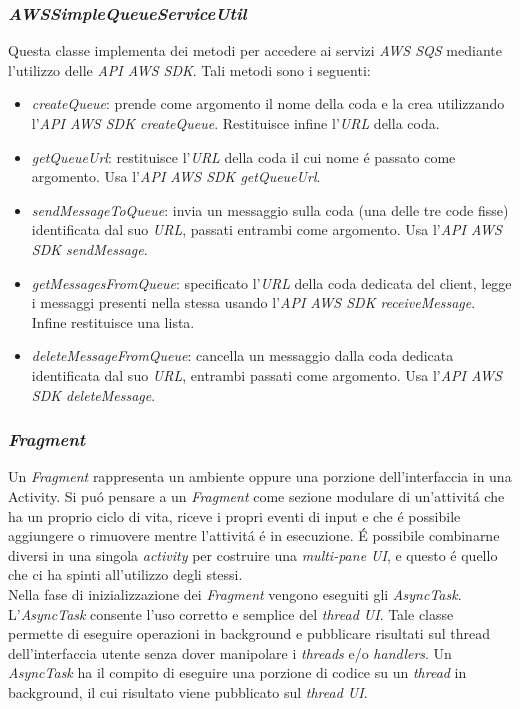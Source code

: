 \documentclass{article}
\begin{document}
\subsubsection{\textit{AWSSimpleQueueServiceUtil}}
Questa classe implementa dei metodi per accedere ai servizi \textit{AWS SQS} mediante l'utilizzo delle \textit{API AWS SDK}. Tali metodi sono i seguenti:
\begin{itemize}
\item	{\textit{createQueue}: prende come argomento il nome della coda e la crea utilizzando l'\textit{API AWS SDK createQueue}. Restituisce infine l'\textit{URL} della coda.}
\item	{\textit{getQueueUrl}: restituisce l'\textit{URL} della coda il cui nome \'e passato come argomento. Usa l'\textit{API AWS SDK getQueueUrl}.}
\item	{\textit{sendMessageToQueue}: invia un messaggio sulla coda (una delle tre code fisse) identificata dal suo \textit{URL}, passati entrambi come argomento.  Usa l'\textit{API AWS SDK sendMessage}. }
\item	{\textit{getMessagesFromQueue}: specificato l'\textit{URL} della coda dedicata del client, legge i messaggi presenti nella stessa usando l'\textit{API AWS SDK receiveMessage}. Infine restituisce una lista.}
\item 	{\textit{deleteMessageFromQueue}: cancella un messaggio dalla coda dedicata identificata dal suo \textit{URL}, entrambi passati come argomento. Usa l'\textit{API AWS SDK deleteMessage}.}
\end{itemize}
\subsubsection{\textit{Fragment}}
Un \textit{Fragment} rappresenta un ambiente oppure una porzione dell'interfaccia in una Activity. Si pu\'o pensare a un \textit{Fragment} come sezione modulare di un'attivit\'a che ha un proprio ciclo di vita, riceve i propri eventi di input e che \'e possibile aggiungere o rimuovere mentre l'attivit\'a \'e in esecuzione. 
\'E possibile combinarne diversi in una singola \textit{activity} per costruire una \textit{multi-pane UI}, e questo \'e quello che ci ha spinti all'utilizzo degli stessi.
\\Nella fase di inizializzazione dei \textit{Fragment} vengono eseguiti gli \textit{AsyncTask}. \\L'\textit{AsyncTask} consente l'uso corretto e semplice del \textit{thread UI}. Tale classe permette di eseguire operazioni in background e pubblicare risultati sul thread dell'interfaccia utente senza dover manipolare i \textit{threads} e/o \textit{handlers}. Un \textit{AsyncTask} ha il compito di eseguire una porzione di codice su un \textit{thread} in background, il cui risultato viene pubblicato sul \textit{thread UI}.
\end{document}
